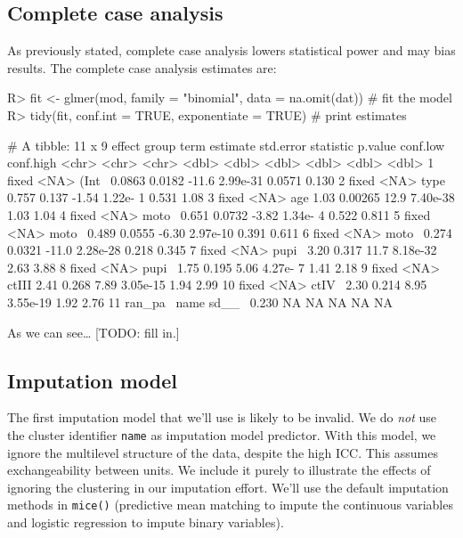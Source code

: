 \documentclass[
]{jss}
\begin{document}
\hypertarget{complete-case-analysis}{%
\subsection{Complete case analysis}\label{complete-case-analysis}}

As previously stated, complete case analysis lowers statistical power
and may bias results. The complete case analysis estimates are:

\begin{CodeChunk}
\begin{CodeInput}
R> fit <- glmer(mod, family = "binomial", data = na.omit(dat)) # fit the model
R> tidy(fit, conf.int = TRUE, exponentiate = TRUE)             # print estimates
\end{CodeInput}
\begin{CodeOutput}
# A tibble: 11 x 9
   effect  group term  estimate std.error statistic   p.value conf.low conf.high
   <chr>   <chr> <chr>    <dbl>     <dbl>     <dbl>     <dbl>    <dbl>     <dbl>
 1 fixed   <NA>  (Int~   0.0863   0.0182     -11.6   2.99e-31   0.0571     0.130
 2 fixed   <NA>  type~   0.757    0.137       -1.54  1.22e- 1   0.531      1.08 
 3 fixed   <NA>  age     1.03     0.00265     12.9   7.40e-38   1.03       1.04 
 4 fixed   <NA>  moto~   0.651    0.0732      -3.82  1.34e- 4   0.522      0.811
 5 fixed   <NA>  moto~   0.489    0.0555      -6.30  2.97e-10   0.391      0.611
 6 fixed   <NA>  moto~   0.274    0.0321     -11.0   2.28e-28   0.218      0.345
 7 fixed   <NA>  pupi~   3.20     0.317       11.7   8.18e-32   2.63       3.88 
 8 fixed   <NA>  pupi~   1.75     0.195        5.06  4.27e- 7   1.41       2.18 
 9 fixed   <NA>  ctIII   2.41     0.268        7.89  3.05e-15   1.94       2.99 
10 fixed   <NA>  ctIV~   2.30     0.214        8.95  3.55e-19   1.92       2.76 
11 ran_pa~ name  sd__~   0.230   NA           NA    NA         NA         NA    
\end{CodeOutput}
\end{CodeChunk}

As we can see\ldots{} {[}TODO: fill in.{]}

\hypertarget{imputation-model}{%
\subsection{Imputation model}\label{imputation-model}}

The first imputation model that we'll use is likely to be invalid. We do
\emph{not} use the cluster identifier \texttt{name} as imputation model
predictor. With this model, we ignore the multilevel structure of the
data, despite the high ICC. This assumes exchangeability between units.
We include it purely to illustrate the effects of ignoring the
clustering in our imputation effort. We'll use the default imputation
methods in \texttt{mice()} (predictive mean matching to impute the
continuous variables and logistic regression to impute binary
variables).
\end{document}
